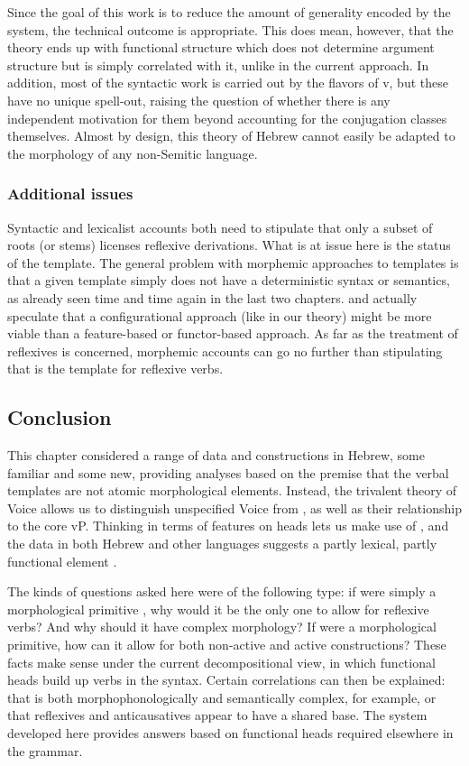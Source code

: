 Since the goal of this work is to reduce the amount of generality encoded by the system, the technical outcome is appropriate. This does mean, however, that the theory ends up with functional structure which does not determine argument structure but is simply correlated with it, unlike in the current approach. In addition, most of the syntactic work is carried out by the flavors of v, but these have no unique spell-out, raising the question of whether there is any independent motivation for them beyond accounting for the conjugation classes themselves. Almost by design, this theory of Hebrew cannot easily be adapted to the morphology of any non-Semitic language.

		\subsubsection{Additional issues}
Syntactic and lexicalist accounts both need to stipulate that only a subset of roots (or stems) licenses reflexive derivations. What is at issue here is the status of the template. The general problem with morphemic approaches to templates is that a given template simply does not have a deterministic syntax or semantics, as already seen time and time again in the last two chapters. \citet[198]{arad05} and \citet[564]{borer13oup} actually speculate that a configurational approach (like in our theory) might be more viable than a feature-based or functor-based approach. As far as the treatment of reflexives is concerned, morphemic accounts can go no further than stipulating that {\thit} is the template for reflexive verbs.

	\subsection{Conclusion} \label{vz:others:conc}
This chapter considered a range of data and constructions in Hebrew, some familiar and some new, providing analyses based on the premise that the verbal templates are not atomic morphological elements. Instead, the trivalent theory of Voice allows us to distinguish unspecified Voice from {\vz}, as well as their relationship to the core vP. Thinking in terms of features on heads lets us make use of {\pz}, and the data in both Hebrew and other languages suggests a partly lexical, partly functional element {\va}.

The kinds of questions asked here were of the following type: if {\thit} were simply a morphological primitive \citep{reinhartsiloni05}, why would it be the only one to allow for reflexive verbs? And why should it have complex morphology? If {\tnif} were a morphological primitive, how can it allow for both non-active and active constructions? These facts make sense under the current decompositional view, in which functional heads build up verbs in the syntax. Certain correlations can then be explained: that {\thit} is both morphophonologically and semantically complex, for example, or that reflexives and anticausatives appear to have a shared base. The system developed here provides answers based on functional heads required elsewhere in the grammar.

